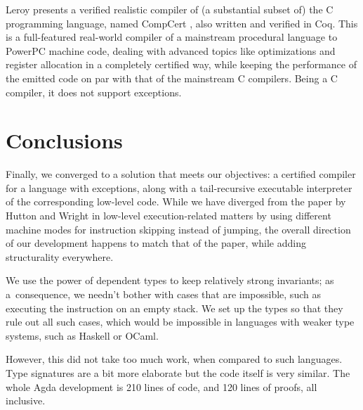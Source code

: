 Leroy presents a verified realistic compiler of (a substantial subset of) the C programming language,
named CompCert \cite{leroy09}, also written and verified in Coq. This is a full-featured real-world
compiler of a mainstream procedural language to PowerPC machine code, dealing with advanced topics
like optimizations and register allocation in a completely certified way, while keeping
the performance of the emitted code on par with that of the mainstream C compilers. Being a C
compiler, it does not support exceptions.

\section{Conclusions}

Finally, we converged to a solution that meets our objectives: a certified compiler for a
language with exceptions, along with a tail-recursive executable interpreter of the corresponding
low-level code. While we have diverged from the
paper by Hutton and Wright \cite{gmh:exceptions} in low-level execution-related matters
by using different machine modes for instruction skipping instead of jumping, the overall
direction of our development happens to match that of the paper, while adding
structurality everywhere.

We use the power of dependent types to keep relatively strong invariants; as a~consequence,
we needn't bother with cases that are impossible, such as executing the instruction 
on an empty stack. We set up the types so that they rule out all such cases, which would be
impossible in languages with weaker type systems, such as Haskell or OCaml.

However, this did not take too much work, when compared to such languages.
Type signatures are a bit more elaborate but the code itself is very similar. The whole Agda
development is 210 lines of code, and 120 lines of proofs, all inclusive.

